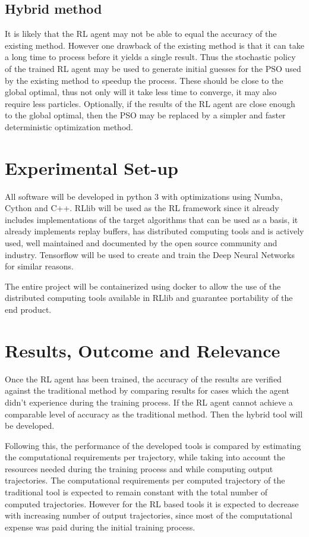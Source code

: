 \documentclass[12pt, english, NoHyper]{AE4010-template}
\begin{document}
\subsection{Hybrid method}
It is likely that the RL agent may not be able to equal the accuracy of the existing method. However one drawback of the existing method is that it can take a long time to process before it yields a single result. Thus the stochastic policy of the trained RL agent may be used to generate initial guesses for the PSO used by the existing method to speedup the process. These should be close to the global optimal, thus not only will it take less time to converge, it may also require less particles. Optionally, if the results of the RL agent are close enough to the global optimal, then the PSO may be replaced by a simpler and faster deterministic optimization method.


\section{Experimental Set-up}
All software will be developed in python 3 with optimizations using Numba, Cython and C++. RLlib will be used as the RL framework since it already includes implementations of the target algorithms that can be used as a basis, it already implements replay buffers, has distributed computing tools and is actively used, well maintained and documented by the open source community and industry. Tensorflow will be used to create and train the Deep Neural Networks for similar reasons.

The entire project will be containerized using docker to allow the use of the distributed computing tools available in RLlib and guarantee portability of the end product.


\section{Results, Outcome and Relevance}
Once the RL agent has been trained, the accuracy of the results are verified against the traditional method by comparing results for cases which the agent didn't experience during the training process. If the RL agent cannot achieve a comparable level of accuracy as the traditional method. Then the hybrid tool will be developed.

Following this, the performance of the developed tools is compared by estimating the computational requirements per trajectory, while taking into account the resources needed during the training process and while computing output trajectories. The computational requirements per computed trajectory of the traditional tool is expected to remain constant with the total number of computed trajectories. However for the RL based tools it is expected to decrease with increasing number of output trajectories, since most of the computational expense was paid during the initial training process.
\end{document}
